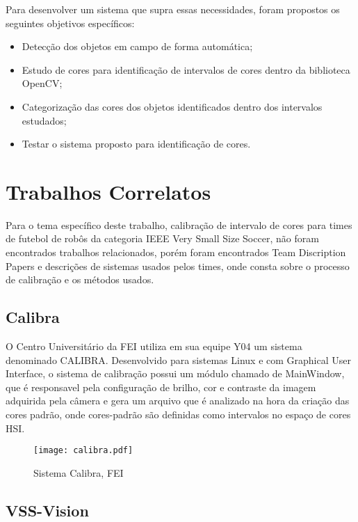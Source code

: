 Para desenvolver um sistema que supra essas necessidades, foram propostos os seguintes objetivos específicos:

\begin{itemize}
	
	\item Detecção dos objetos em campo de forma automática; 
	\item Estudo de cores para identificação de intervalos de cores dentro da biblioteca OpenCV;
	\item Categorização das cores dos objetos identificados dentro dos intervalos estudados;
	\item Testar o sistema proposto para identificação de cores.
	
	
\end{itemize}

\newpage

\section{Trabalhos Correlatos}
Para o tema específico deste trabalho, calibração de intervalo de cores para times de futebol de robôs da categoria IEEE Very Small Size Soccer, não foram encontrados trabalhos relacionados, porém foram encontrados Team Discription Papers e descrições de sistemas usados pelos times, onde consta sobre o processo de calibração e os métodos usados\cite{Penharbel:2004}\cite{Rosa:2015}\cite{VSSVision}\cite{PenharbelTime}.

\subsection{Calibra}
O Centro Universitário da FEI\cite{PenharbelTime} utiliza em sua equipe Y04 um sistema denominado CALIBRA\cite{Penharbel:2004}. Desenvolvido para sistemas Linux e com Graphical User Interface\cite{Penharbel:2004}, o sistema de calibração possui um módulo chamado de MainWindow, que é responsavel pela configuração de brilho, cor e contraste da imagem adquirida pela câmera e gera um arquivo que é analizado na hora da criação das cores padrão\cite{PenharbelTime}, onde cores-padrão são definidas como intervalos no espaço de cores HSI\cite{PenharbelTime}.
\begin{figure}[H]
	\centering
	\texttt{[image: calibra.pdf]}
	\caption{Sistema Calibra, FEI\cite{Penharbel:2004}}
	\label{Calibra}
\end{figure}

\subsection{VSS-Vision}

